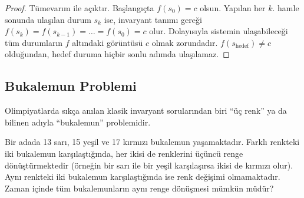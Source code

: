 \begin{proof}
Tümevarım ile açıktır. Başlangıçta $f(s_0) = c$ olsun. Yapılan her $k$. hamle sonunda ulaşılan durum $s_k$ ise, invaryant tanımı gereği $f(s_k) = f(s_{k-1}) = \dots = f(s_0) = c$ olur. Dolayısıyla sistemin ulaşabileceği tüm durumların $f$ altındaki görüntüsü $c$ olmak zorundadır. $f(s_{\text{hedef}}) \neq c$ olduğundan, hedef duruma hiçbir sonlu adımda ulaşılamaz.
\end{proof}

\subsection{Bukalemun Problemi}

Olimpiyatlarda sıkça anılan klasik invaryant sorularından biri ``üç renk'' ya da bilinen adıyla ``bukalemun'' problemidir.

\begin{example}
Bir adada 13 sarı, 15 yeşil ve 17 kırmızı bukalemun yaşamaktadır. Farklı renkteki iki bukalemun karşılaştığında, her ikisi de renklerini üçüncü renge dönüştürmektedir (örneğin bir sarı ile bir yeşil karşılaşırsa ikisi de kırmızı olur). Aynı renkteki iki bukalemun karşılaştığında ise renk değişimi olmamaktadır. Zaman içinde tüm bukalemunların aynı renge dönüşmesi mümkün müdür?
\end{example}

